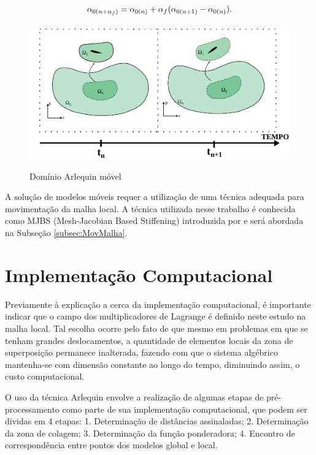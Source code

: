 \documentclass[tese_patricia]{subfiles}
\begin{document}
\begin{align}
	\alpha_{0(n+\alpha_f)} = \alpha_{0(n)} + \alpha_f(\alpha_{0(n+1)} - \alpha_{0(n)}).
\end{align}

\begin{figure}[htb!]
	\centering 
	{\includegraphics[scale=1.0,trim=0cm 0cm 0cm 0cm, clip=true]{Imagens/Cap6/dominioArlequinMoving.pdf}}	
	\caption{Domínio Arlequin móvel}
	\label{fig:ArlquinMóvel}
\end{figure}

A solução de modelos móveis requer a utilização de uma técnica adequada para movimentação da malha local. A técnica utilizada nesse trabalho é conhecida como MJBS (Mesh-Jacobian Based Stiffening) introduzida por  e será abordada na Subseção \ref{subsec:MovMalha}.


\section{Implementação Computacional}


Previamente à explicação a cerca da implementação computacional, é importante indicar que o campo dos multiplicadores de Lagrange é definido neste estudo na malha local. Tal escolha ocorre pelo fato de que mesmo em problemas em que se tenham grandes deslocamentos, a quantidade de elementos locais da zona de superposição permanece inalterada, fazendo com que o sistema algébrico mantenha-se com dimensão constante ao longo do tempo, diminuindo assim, o custo computacional.

O uso da técnica Arlequin envolve a realização de algumas etapas de pré-processamento como parte de sua implementação computacional, que podem ser dividas em 4 etapas: 1. Determinação de distâncias assinaladas; 2. Determinação da zona de colagem;  3. Determinação da função ponderadora; 4. Encontro de correspondência entre pontos dos modelos global e local.
\end{document}

